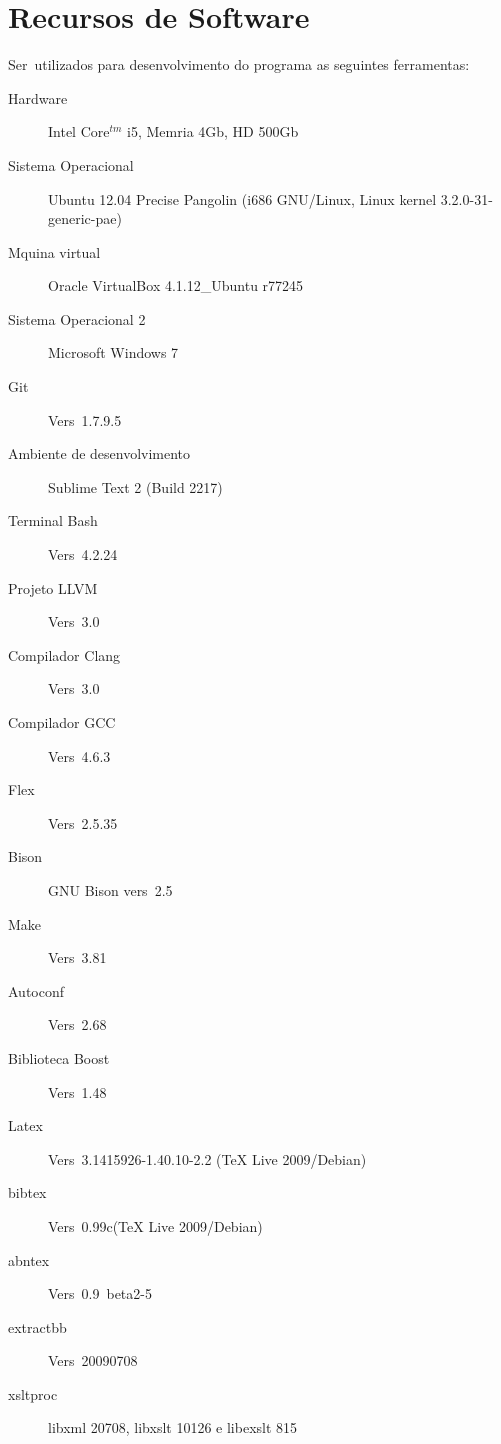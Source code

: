 \chapter{Recursos de Software}

\label{pro:recursos}

Ser\ao\ utilizados para desenvolvimento do programa as seguintes ferramentas:
\begin{description}
  \item[Hardware] Intel Core$^{tm}$ i5, Mem\oh ria 4Gb, HD 500Gb
  \item[Sistema Operacional] Ubuntu 12.04 Precise Pangolin (i686 GNU/Linux, Linux kernel 3.2.0-31-generic-pae)
  \item[M\ah quina virtual] Oracle VirtualBox 4.1.12\_Ubuntu r77245
  \item[Sistema Operacional 2] Microsoft Windows 7
  \item[Git] Vers\ao\ 1.7.9.5
  \item[Ambiente de desenvolvimento] Sublime Text 2 (Build 2217)
  \item[Terminal Bash] Vers\ao\ 4.2.24
  \item[Projeto LLVM] Vers\ao\ 3.0
  \item[Compilador Clang] Vers\ao\ 3.0
  \item[Compilador GCC] Vers\ao\ 4.6.3
  \item[Flex] \label{pro:flex}Vers\ao\ 2.5.35
  \item[Bison] \label{pro:bison}GNU Bison vers\ao\ 2.5
  \item[Make] Vers\ao\ 3.81
  \item[Autoconf] Vers\ao\ 2.68
  \item[Biblioteca Boost] Vers\ao\ 1.48
  \item[Latex] Vers\ao\ 3.1415926-1.40.10-2.2 (TeX Live 2009/Debian)
  \item[bibtex] Vers\ao\ 0.99c(TeX Live 2009/Debian)
  \item[abntex] Vers\ao\ 0.9~beta2-5
  \item[extractbb] Vers\ao\ 20090708
  \item[xsltproc] libxml 20708, libxslt 10126 e libexslt 815
\end{description}
